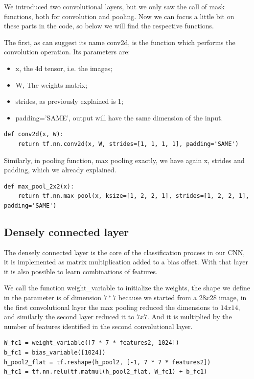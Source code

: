 We introduced two convolutional layers, but we only saw the call of mask functions, both for convolution and pooling. Now we can focus a little bit on these parts in the code, so below we will find the respective functions.

The first, as can suggest its name conv2d, is the function which performs the convolution operation. Its parameters are:

\begin{itemize}
	\item x, the 4d tensor, i.e. the images;
	\item W, The weights matrix;
	\item strides, as previously explained is 1;
	\item padding='SAME', output will have the same dimension of the input.
\end{itemize}

\begin{lstlisting}
def conv2d(x, W):
	return tf.nn.conv2d(x, W, strides=[1, 1, 1, 1], padding='SAME')
\end{lstlisting}

Similarly, in pooling function, max pooling exactly, we have again x, strides and padding, which we already explained.

\begin{lstlisting}
def max_pool_2x2(x):
	return tf.nn.max_pool(x, ksize=[1, 2, 2, 1], strides=[1, 2, 2, 1], padding='SAME')
\end{lstlisting}

\subsection{Densely connected layer}

The densely connected layer is the core of the classification process in our \acs{CNN}, it is implemented as matrix multiplication added to a bias offset. With that layer it is also possible to learn combinations of features.

We call the function weight_variable to initialize the weights, the shape we define in the parameter is of dimension $7*7$ because we started from a $28x28$ image, in the first convolutional layer the max pooling reduced the dimensions to $14x14$, and similarly the second layer reduced it to $7x7$. And it is multiplied by the number of features identified in the second convolutional layer.

\begin{lstlisting}
W_fc1 = weight_variable([7 * 7 * features2, 1024])
b_fc1 = bias_variable([1024])
h_pool2_flat = tf.reshape(h_pool2, [-1, 7 * 7 * features2])
h_fc1 = tf.nn.relu(tf.matmul(h_pool2_flat, W_fc1) + b_fc1)
\end{lstlisting}

